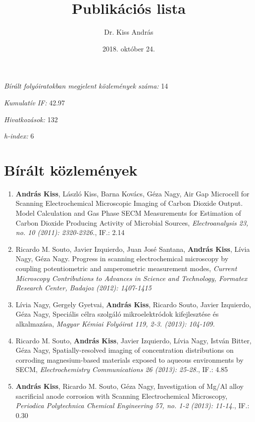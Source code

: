 \documentclass[11pt,a4paper,roman]{article}
\date{2018. október 24.}
\title{Publikációs lista}
\author{Dr. Kiss András}
\begin{document}
\maketitle

\emph{Bírált folyóiratokban megjelent közlemények száma:} 14

\emph{Kumulatív IF:} 42.97

\emph{Hivatkozások:} 132

\emph{h-index:} 6

\section{Bírált közlemények}
\begin{enumerate}

\item \textbf{András Kiss}, László Kiss, Barna Kovács, Géza Nagy, Air Gap Microcell for Scanning Electrochemical Microscopic Imaging of Carbon Dioxide Output. Model Calculation and Gas Phase SECM Measurements for Estimation of Carbon Dioxide Producing Activity of Microbial Sources, \emph{Electroanalysis 23, no. 10 (2011): 2320-2326.}, IF.: 2.14


\item Ricardo M. Souto, Javier Izquierdo, Juan José Santana, \textbf{András Kiss}, Lívia Nagy, Géza Nagy. Progress in scanning electrochemical microscopy by coupling potentiometric and amperometric measurement modes, \emph{Current Microscopy Contributions to Advances in Science and Technology, Formatex Research Center, Badajoz (2012): 1407-1415}

\item Lívia Nagy, Gergely Gyetvai, \textbf{András Kiss}, Ricardo Souto, Javier Izquierdo, Géza Nagy, Speciális célra szolgáló mikroelektródok kifejlesztése és alkalmazása, \emph{Magyar Kémiai Folyóirat 119, 2-3. (2013): 104-109.}

\item Ricardo M. Souto, \textbf{András Kiss}, Javier Izquierdo, Lívia Nagy, István Bitter, Géza Nagy, Spatially-resolved imaging of concentration distributions on corroding mag\-ne\-si\-um-based materials exposed to aqueous environments by SECM, \emph{Electrochemistry Communications 26 (2013): 25-28.}, IF.: 4.85

\item \textbf{András Kiss}, Ricardo M. Souto, Géza Nagy, Investigation of Mg/Al alloy sacrificial anode corrosion with Scanning Electrochemical Microscopy, \emph{Periodica Polytechnica Chemical Engineering 57, no. 1-2 (2013): 11-14.}, IF.: 0.30


\end{enumerate}
\end{document}
